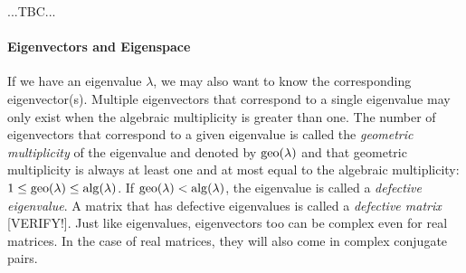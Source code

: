 ...TBC...







\paragraph{Eigenvectors and Eigenspace}
If we have an eigenvalue $\lambda$, we may also want to know the corresponding eigenvector(s). Multiple eigenvectors that correspond to a single eigenvalue may only exist when the algebraic multiplicity is greater than one. The number of eigenvectors that correspond to a given eigenvalue is called the \emph{geometric multiplicity} of the eigenvalue and denoted by $\operatorname{geo}(\lambda)$ and that geometric multiplicity is always at least one and at most equal to the algebraic multiplicity: $1 \leq \operatorname{geo}(\lambda) \leq \operatorname{alg}(\lambda)$. If $\operatorname{geo}(\lambda) < \operatorname{alg}(\lambda)$, the eigenvalue is called a \emph{defective eigenvalue}. A matrix that has defective eigenvalues is called a \emph{defective matrix} [VERIFY!]. Just like eigenvalues, eigenvectors too can be complex even for real matrices. In the case of real matrices, they will also come in complex conjugate pairs. 

